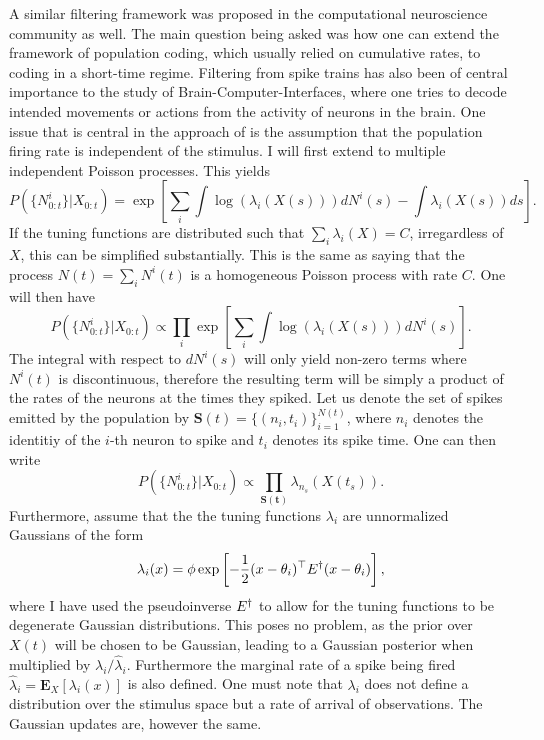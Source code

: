{A similar filtering framework was proposed in the computational neuroscience community as well. The main question being asked was how one can extend the 
framework of population coding, which usually relied on cumulative rates, to coding in a short-time regime. Filtering from spike trains has also been of central importance to the study of 
Brain-Computer-Interfaces, where one tries to decode intended movements or actions from the activity of neurons in the brain. One issue that is central in the 
approach of  is the assumption that the population firing rate is independent of the stimulus. I will first extend  to multiple independent Poisson 
processes. This yields
\begin{equation}
\label{eq:dspp_multi_likelihood}
P(\{N^i_{0:t}\}|X_{0:t}) = \exp\left[\sum_i \int \log(\lambda_i(X(s)))dN^i(s) -\int \lambda_i(X(s))ds\right].
\end{equation}
If the tuning functions are distributed such that $\sum_i\lambda_i(X) = C$, irregardless of $X$, this can be simplified substantially. This is the same as saying that the process 
$N(t) = \sum_i N^i(t)$ is a homogeneous Poisson process with rate $C$.
One will then have
\begin{equation}
P(\{N^i_{0:t}\}|X_{0:t}) \propto \prod_i \exp\left[\sum_i \int \log(\lambda_i(X(s))) dN^i(s)\right].
\end{equation}
The integral with respect to $dN^i(s)$ will only yield non-zero terms where $N^i(t)$ is discontinuous, therefore the resulting term will be simply a product of the rates of the neurons at the times they spiked. Let us denote the set of spikes emitted by the population by $\boldsymbol{S}(t) = \{(n_i,t_i)\}_{i=1}^{N(t)}$, where $n_i$ denotes the identitiy of the $i$-th neuron to spike and $t_i$ denotes its spike time. One can then write
\begin{equation}
P(\{N^i_{0:t}\}|X_{0:t}) \propto \prod_{\boldsymbol{S(t)}} \lambda_{n_s}(X(t_s)).
\end{equation}
Furthermore, assume that the the tuning functions $\lambda_i$ are unnormalized Gaussians of the form
\begin{equation}
\label{eq:dense_poiss_gauss_tf}
\lambda_i(x) = \phi \exp\left[-\frac{1}{2} (x-\theta_i)^\top \covar^\dagger (x-\theta_i)\right],
\end{equation}
where I have used the pseudoinverse $E^\dagger$ to allow for the tuning functions to be degenerate Gaussian distributions. This poses no problem, as the prior 
over $X(t)$ will be chosen to be Gaussian, leading to a Gaussian posterior when multiplied by $\lambda_i/\hat{\lambda}_i$.
Furthermore the marginal rate of a spike being fired $\hat{\lambda}_i = \boldsymbol{E}_X\left[\lambda_i(x)\right]$ is also 
defined. One must note that $\lambda_i$ does not define a distribution over the stimulus space but a rate of arrival of observations. The Gaussian updates are, however 
the same.\par

}
